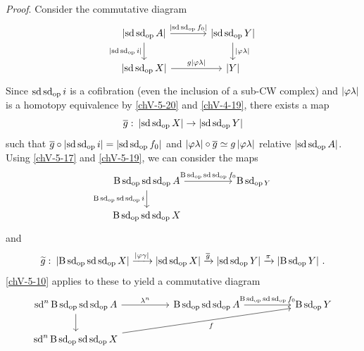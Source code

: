         \emph{Proof}. Consider the commutative diagram
        \begin{equation*}
            \begin{tikzcd}[column sep=large]
                \gr{\sd \sd_{\op} A} \arrow[d, "\gr{\sd \sd_{\op} i}"'] \arrow[r, "\gr{\sd \sd_{\op} f_0}"] & \gr{\sd \sd_{\op} Y} \arrow[d, "\gr{\varphi \lambda}"] \\
                \gr{\sd \sd_{\op} X} \arrow[r, "g \gr{\varphi \lambda}"] & \gr{Y}
            \end{tikzcd}
        \end{equation*}
        Since $\operatorname{sd} \operatorname{sd}_{\operatorname{op}} i$ is a cofibration (even the inclusion of a sub-CW complex) and $\left| \varphi \lambda \right|$ is a homotopy equivalence by \ref{chV-5-20} and \ref{chV-4-19}, there exists a map
        \begin{equation*}
            \overline{g} \,\colon \left| \operatorname{sd} \operatorname{sd}_{\operatorname{op}} X \right| \to \left| \operatorname{sd} \operatorname{sd}_{\operatorname{op}} Y \right|
        \end{equation*}
        such that $\overline{g} \circ \left| \operatorname{sd} \operatorname{sd}_{\operatorname{op}} i \right| = \left| \operatorname{sd} \operatorname{sd}_{\operatorname{op}} f_0 \right|$ and $\left| \varphi \lambda \right| \circ \overline{g} \simeq g \left| \varphi \lambda \right|$ relative $\left| \operatorname{sd} \operatorname{sd}_{\operatorname{op}} A \right|$.\\
        Using \ref{chV-5-17} and \ref{chV-5-19}, we can consider the maps
        \begin{equation*}
            \begin{tikzcd}[column sep=huge]
                \B \sd_{\op} \sd \sd_{\op} A \arrow[d, "\B \sd_{\op} \sd \sd_{\op} i"'] \arrow[r, "\B \sd_{\op} \sd \sd_{\op} f_0"] & \B \sd_{\op Y} \\
                \B \sd_{\op} \sd \sd_{\op} X &
            \end{tikzcd}
        \end{equation*}
        and
        \begin{equation*}
            \widetilde{g} \,\colon \left| \operatorname{B} \operatorname{sd}_{\operatorname{op}} \operatorname{sd} \operatorname{sd}_{\operatorname{op}} X \right| \xrightarrow{\left| \varphi \gamma \right|} \left| \operatorname{sd} \operatorname{sd}_{\operatorname{op}} X \right| \xrightarrow{\overline{g}} \left| \operatorname{sd} \operatorname{sd}_{\operatorname{op}} Y \right| \xrightarrow{\pi} \left| \operatorname{B} \operatorname{sd}_{\operatorname{op}} Y \right| \,.
        \end{equation*}
        \ref{chV-5-10} applies to these to yield a commutative diagram
        \begin{equation*}
            \begin{tikzcd}[column sep=huge]
                \sd^n \B \sd_{\op} \sd \sd_{\op} A \arrow[d] \arrow[r, "\lambda^n"] & \B \sd_{\op} \sd \sd_{\op} A \arrow[r, "\B \sd_{\op} \sd \sd_{\op} f_0"] & \B \sd_{\op} Y \\
                \sd^n \B \sd_{\op} \sd \sd_{\op} X \arrow[urr, "f"']
            \end{tikzcd}
        \end{equation*}
